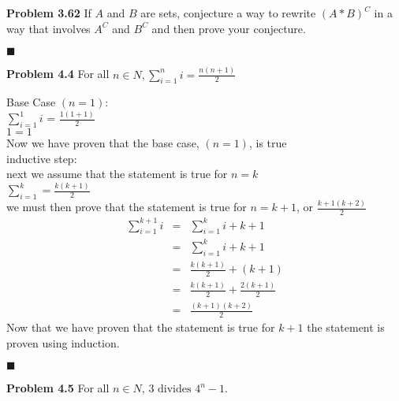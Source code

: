 \documentclass[12pt]{article}
\renewcommand{\qed}{\hfill$\blacksquare$}
\begin{document}
\noindent\textbf{Problem 3.62} If $A$ and $B$ are sets, conjecture a way to rewrite $(A * B)^C$ in a way that involves $A^C$ and $B^C$ and then prove your conjecture.\\
\begin{addmargin}[1em]{1em}
    
    \begin{flushright}
    \qed
    \end{flushright}
\end{addmargin}

\noindent\textbf{Problem 4.4} For all $n \in N, \sum_{i=1}^{n}i = \frac{n(n+1)}{2}$\\
\begin{addmargin}[1em]{1em}
    Base Case $(n=1)$:\\
    $\sum_{i=1}^{1}i$ = $\frac{1(1+1)}{2}$\\
    $1=1$\\
    Now we have proven that the base case, $(n=1)$, is true\\
    inductive step:\\
    next we assume that the statement is true for $n=k$\\
    $\sum_{i=1}^k = \frac{k(k+1)}{2}$\\
    we must then prove that the statement is true for $n=k+1$, or $\frac{k+1(k+2)}{2}$\\
    \begin{align*}
        \sum_{i=1}^{k+1}i &=& \sum_{i=1}^{k}i+k+1\\
        &=& \sum_{i=1}^{k}i+k+1\\
        &=& \frac{k(k+1)}{2} + (k+1)\\
        &=& \frac{k(k+1)}{2} + \frac{2(k+1)}{2}\\
        &=& \frac{(k+1)(k+2)}{2}
    \end{align*}
    Now that we have proven that the statement is true for $k + 1$ the statement is proven using induction.
    \begin{flushright}
    \qed
    \end{flushright}
\end{addmargin}
\noindent\textbf{Problem 4.5} For all $n \in N\text{, } 3 \text{ divides } 4^n-1$.\\
\end{document}
